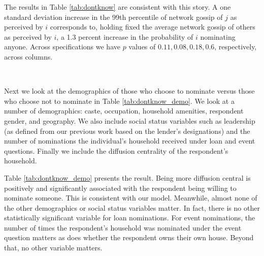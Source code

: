 The results in Table \ref{tab:dontknow} are consistent with this story. A one standard deviation increase in the 99th percentile of network gossip of $j$ as perceived by $i$ corresponds to, holding fixed the average network gossip of others as perceived by $i$, a 1.3 percent increase in the probability of $i$ nominating anyone. Across specifications we have $p$ values of $0.11,0.08,0.18,0.6$, respectively, across columns.


\

Next we look at the demographics of those who choose to nominate versus those who choose not to nominate in Table \ref{tab:dontknow_demo}. We look at a number of demographics: caste, occupation, household amenities, respondent gender, and geography. We also include social status variables such as leadership (as defined from our previous work based on the lender's designations) and the number of nominations the individual's household received under loan and event questions. Finally we include the diffusion centrality of the respondent's household.

\begin{table}[!h]
\centering
\caption{Demographics of those who choose to nominate}\label{tab:dontknow_demo}
\end{table}


Table \ref{tab:dontknow_demo} presents the result. Being more diffusion central is positively and significantly associated with the respondent being willing to nominate someone. This is consistent with our model. Meanwhile, almost none of the other demographics or social status variables matter. In fact, there is no other statistically significant variable for loan nominations. For event nominations, the number  of times the respondent's household was nominated under the event question matters as does whether the respondent owns their own house. Beyond that, no other variable matters.

